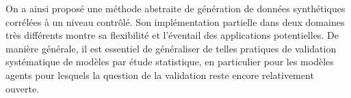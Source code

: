 On a ainsi proposé une méthode abstraite de génération de données synthétiques corrélées à un niveau contrôlé. Son implémentation partielle dans deux domaines très différents montre sa flexibilité et l'éventail des applications potentielles. De manière générale, il est essentiel de généraliser de telles pratiques de validation systématique de modèles par étude statistique, en particulier pour les modèles agents pour lesquels la question de la validation reste encore relativement ouverte.








\footnotesize






